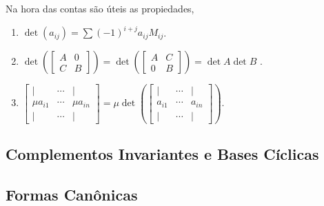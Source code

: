 \begin{note}
    Na hora das contas são úteis as propiedades,
    \begin{enumerate}[label = \roman*.]
        \item \(\det (a_{ij}) = \sum (-1)^{i+j} a_{ij} M_{ij}\). 
        \item  {\small\( \det \left(\begin{bmatrix}
            A & 0 \\ 
            C & B
        \end{bmatrix}\right) = \det \left(\begin{bmatrix}
            A & C \\ 
            0 & B
        \end{bmatrix}\right) = \det A \det B\) }.  
        \item {\small \(\begin{bmatrix}
        | & \cdots & | \\ 
        \mu a_{i1} & \cdots & \mu a_{in}\\
        | & \cdots & |
        \end{bmatrix} = \mu \det \left(\begin{bmatrix}
        | & \cdots & | \\ 
        a_{i1} & \cdots & a_{in}\\
        | & \cdots & |
        \end{bmatrix}\right)\)}. 
    \end{enumerate}
\end{note}

\subsection{Complementos Invariantes e Bases Cíclicas}

\subsection{Formas Canônicas}

